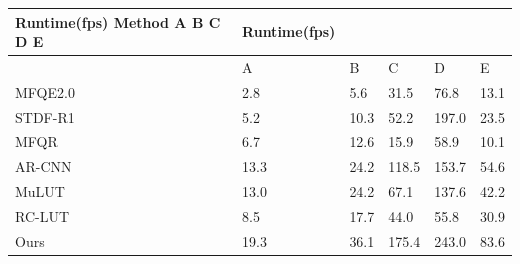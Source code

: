\begin{tabular}{llllll}
\toprule
Runtime(fps) Method A B C D E & Runtime(fps) &  &  &  &  \\
\midrule
 & A & B & C & D & E \\
MFQE2.0 & 2.8 & 5.6 & 31.5 & 76.8 & 13.1 \\
STDF-R1 & 5.2 & 10.3 & 52.2 & 197.0 & 23.5 \\
MFQR & 6.7 & 12.6 & 15.9 & 58.9 & 10.1 \\
AR-CNN & 13.3 & 24.2 & 118.5 & 153.7 & 54.6 \\
MuLUT & 13.0 & 24.2 & 67.1 & 137.6 & 42.2 \\
RC-LUT & 8.5 & 17.7 & 44.0 & 55.8 & 30.9 \\
Ours & 19.3 & 36.1 & 175.4 & 243.0 & 83.6 \\
\bottomrule
\end{tabular}
